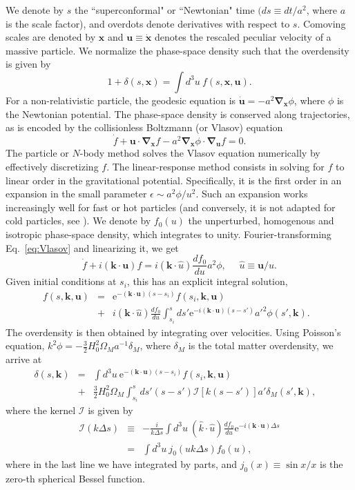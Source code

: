 \documentclass[useAMS, usenatbib]{mnras}
\newcommand{\beq}{\begin{equation}}
\newcommand{\eeq}{\end{equation}}
\newcommand{\barr}{\begin{eqnarray}}
\newcommand{\earr}{\end{eqnarray}}
\newcommand{\rme}{\textrm{e}}
\newcommand{\bs}{\mathbf}
\begin{document}
We denote by $s$ the ``superconformal" or ``Newtonian" time $(ds \equiv dt/a^2$, where $a$ is the scale factor), and overdots denote derivatives with respect to $s$. Comoving scales are denoted by $\bs{x}$ and $\bs{u} \equiv \dot{\bs{x}}$ denotes the rescaled peculiar velocity of a massive particle. We normalize the phase-space density such that the overdensity is given by
\beq
1 + \delta(s, \bs{x}) = \int d^3 u ~ f(s, \bs{x}, \bs{u}).
\eeq
For a non-relativistic particle, the geodesic equation is $\dot{\bs{u}} = - a^2  \bs{\nabla}_{\bs{x}} \phi$, where $\phi$ is the Newtonian potential. The phase-space density is conserved along trajectories, as is encoded by the collisionless Boltzmann (or Vlasov) equation
\beq
\dot{f} + \bs{u} \cdot \bs{\nabla}_{\bs{x}} f - a^2 \bs{\nabla}_{\bs{x}} \phi \cdot \bs{\nabla}_{\bs{u}} f = 0. \label{eq:Vlasov}
\eeq
The particle or $N$-body method solves the Vlasov equation numerically by effectively discretizing $f$. The linear-response method consists in solving for $f$ to linear order in the gravitational potential. Specifically, it is the first order in an expansion in the small parameter $\epsilon \sim a^2 \phi/u^2$. Such an expansion works increasingly well for fast or hot particles (and conversely, it is not adapted for cold particles, see \citealt{YAH_15}). We denote by $f_0(u)$ the unperturbed, homogenous and isotropic phase-space density, which integrates to unity. Fourier-transforming Eq.~\eqref{eq:Vlasov} and linearizing it, we get
\beq
\dot{f} + i (\bs{k} \cdot \bs{u}) f = i (\bs{k} \cdot  \hat{u}) \frac{d f_0}{du} a^2 \phi ,  \ \ \ \ \ \ \hat{u} \equiv \bs{u}/u.
\eeq
Given initial conditions at $s_i$, this has an explicit integral solution,
\barr
f(s, \bs{k}, \bs{u}) &=& \rme^{- (\bs{k} \cdot \bs{u}) (s - s_i)} f(s_i, \bs{k}, \bs{u}) \nonumber\\
&+& i (\bs{k} \cdot  \hat{u}) \frac{d f_0}{du} \int_{s_i}^s d s' \rme^{- i(\bs{k} \cdot \bs{u}) (s - s')} a'^2 \phi(s', \bs{k}).~~~
\earr
The overdensity is then obtained by integrating over velocities. Using Poisson's equation, $k^2 \phi = - \frac32 H_0^2 \Omega_M a^{-1} \delta_M$, where $\delta_M$ is the total matter overdensity, we arrive at
\barr
\delta(s, \bs{k}) &=& \int d^3 u ~ \rme^{- (\bs{k} \cdot \bs{u}) (s - s_i)} f(s_i, \bs{k}, \bs{u}) \nonumber\\
&+& \frac32 H_0^2 \Omega_M \int_{s_i}^s d s' (s-s') \mathcal{I}[k(s-s')] a' \delta_M(s', \bs{k}), ~~~~\label{eq:delta-phi}
\earr
where the kernel $\mathcal{I}$ is given by \citep{Brandenberger_1987, Bertschinger_Watts_1988}
\barr
\mathcal{I}(k \Delta s) &\equiv& - \frac{i}{k \Delta s} \int d^3 u  ~(\hat{k} \cdot  \hat{u}) \frac{d f_0}{du}\rme^{- i(\bs{k} \cdot \bs{u}) \Delta s} \nonumber\\
&=& \int d^3 u ~	 j_0(u k \Delta s) f_0(u),
\earr
where in the last line we have integrated by parts, and $j_0(x) \equiv \sin x/x$ is the zero-th spherical Bessel function.
\end{document}
